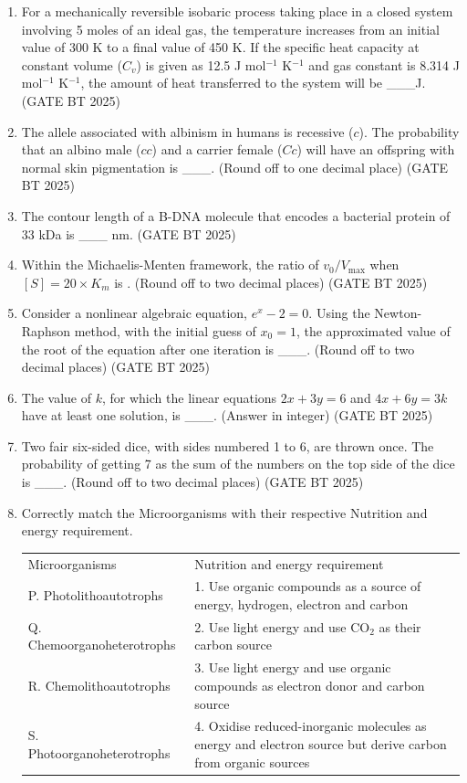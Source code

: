 \documentclass[journal,12pt,onecolumn]{IEEEtran}
\theoremstyle{remark}
\begin{document}
\begin{enumerate}
\item For a mechanically reversible isobaric process taking place in a closed system involving 5 moles of an ideal gas, the temperature increases from an initial value of 300 K to a final value of 450 K. If the specific heat capacity at constant volume ($C_v$) is given as 12.5 J mol$^{-1}$ K$^{-1}$ and gas constant is 8.314 J mol$^{-1}$ K$^{-1}$, the amount of heat transferred to the system will be \_\_\_J.  
\hfill (GATE BT 2025)

\item The allele associated with albinism in humans is recessive ($c$). The probability that an albino male ($cc$) and a carrier female ($Cc$) will have an offspring with normal skin pigmentation is \_\_\_.  
(Round off to one decimal place)  
\hfill (GATE BT 2025)

\item The contour length of a B-DNA molecule that encodes a bacterial protein of 33 kDa is \_\_\_ nm.  
\hfill (GATE BT 2025)

\item Within the Michaelis-Menten framework, the ratio of $v_0 / V_{\max}$ when $[S] = 20 \times K_m$ is .  
(Round off to two decimal places)  
\hfill (GATE BT 2025)

\item Consider a nonlinear algebraic equation, $e^x - 2 = 0$. Using the Newton-Raphson method, with the initial guess of $x_0 = 1$, the approximated value of the root of the equation after one iteration is \_\_\_.  
(Round off to two decimal places)  
\hfill (GATE BT 2025)

\item The value of $k$, for which the linear equations $2x + 3y = 6$ and $4x + 6y = 3k$ have at least one solution, is \_\_\_.  
(Answer in integer)  
\hfill (GATE BT 2025)

\item Two fair six-sided dice, with sides numbered 1 to 6, are thrown once. The probability of getting 7 as the sum of the numbers on the top side of the dice is \_\_\_.  
(Round off to two decimal places)  
\hfill (GATE BT 2025)

\item Correctly match the Microorganisms with their respective Nutrition and energy requirement.  

\begin{tabular}{ll}
Microorganisms & Nutrition and energy requirement \\
P. Photolithoautotrophs & 1. Use organic compounds as a source of energy, hydrogen, electron and carbon \\
Q. Chemoorganoheterotrophs & 2. Use light energy and use CO$_2$ as their carbon source \\
R. Chemolithoautotrophs & 3. Use light energy and use organic compounds as electron donor and carbon source \\
S. Photoorganoheterotrophs & 4. Oxidise reduced-inorganic molecules as energy and electron source but derive carbon from organic sources
\end{tabular}  


\end{enumerate}
\end{document}
